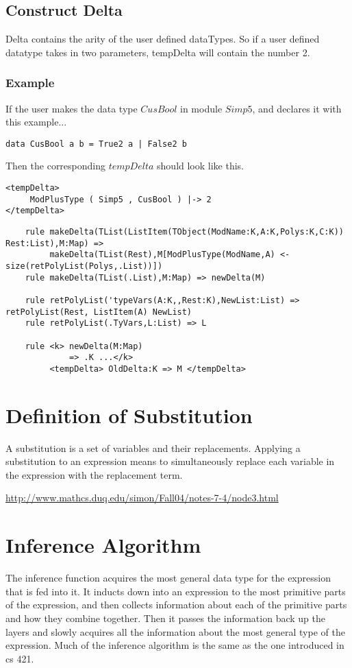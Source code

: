 \subsection{Construct Delta}
Delta contains the arity of the user defined dataTypes. So if a user defined datatype takes in two parameters, tempDelta will contain the number 2.

\subsubsection{Example}
If the user makes the data type $CusBool$ in module $Simp5$, and declares it with this example...
\begin{lstlisting}
data CusBool a b = True2 a | False2 b
\end{lstlisting}

Then the corresponding $tempDelta$ should look like this.

\begin{lstlisting}
<tempDelta>
     ModPlusType ( Simp5 , CusBool ) |-> 2
</tempDelta>
\end{lstlisting}

\begin{lstlisting}
    rule makeDelta(TList(ListItem(TObject(ModName:K,A:K,Polys:K,C:K)) Rest:List),M:Map) =>
         makeDelta(TList(Rest),M[ModPlusType(ModName,A) <- size(retPolyList(Polys,.List))])
    rule makeDelta(TList(.List),M:Map) => newDelta(M)

    rule retPolyList('typeVars(A:K,,Rest:K),NewList:List) => retPolyList(Rest, ListItem(A) NewList)
    rule retPolyList(.TyVars,L:List) => L

    rule <k> newDelta(M:Map)
             => .K ...</k>
         <tempDelta> OldDelta:K => M </tempDelta>

\end{lstlisting}


\section{Definition of Substitution}
A substitution is a set of variables and their replacements. Applying a substitution to an expression means to simultaneously replace each variable in the expression with the replacement term.

\url{http://www.mathcs.duq.edu/simon/Fall04/notes-7-4/node3.html}

\section{Inference Algorithm}
The inference function acquires the most general data type for the expression that is fed into it. It inducts down into an expression to the most primitive parts of the expression, and then collects information about each of the primitive parts and how they combine together. Then it passes the information back up the layers and slowly acquires all the information about the most general type of the expression. 
Much of the inference algorithm is the same as the one introduced in cs 421.

